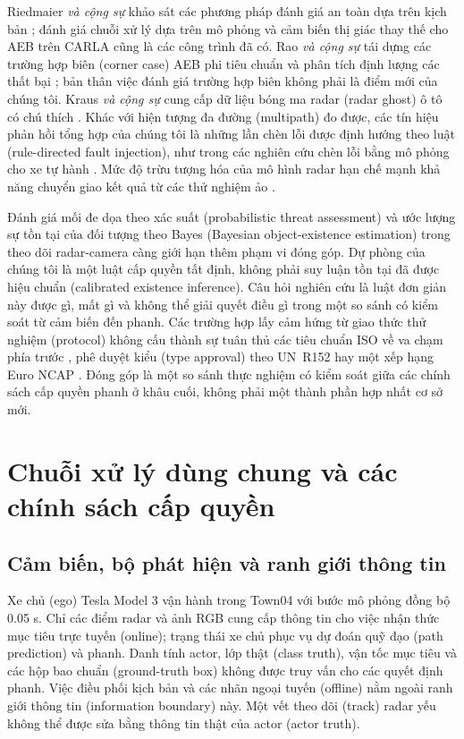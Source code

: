 \documentclass[11pt,a4paper]{article}
\begin{document}
Riedmaier \emph{và cộng sự} khảo sát các phương pháp đánh giá an toàn dựa trên
kịch bản \cite{riedmaier2020survey}; đánh giá chuỗi xử lý dựa trên mô phỏng
\cite{gomez2022carla} và cảm biến thị giác thay thế cho AEB trên CARLA
\cite{feng2025dvs} cũng là các công trình đã có. Rao \emph{và cộng sự} tái
dựng các trường hợp biên (corner case) AEB phi tiêu chuẩn và phân tích định
lượng các thất bại \cite{rao2024corner}; bản thân việc đánh giá trường hợp
biên không phải là điểm mới của chúng tôi. Kraus \emph{và cộng sự} cung cấp
dữ liệu bóng ma radar (radar ghost) ô tô có chú thích \cite{kraus2021ghost}.
Khác với hiện tượng đa đường (multipath) đo được, các tín hiệu phản hồi tổng
hợp của chúng tôi là những lần chèn lỗi được định hướng theo luật
(rule-directed fault injection), như trong các nghiên cứu chèn lỗi bằng mô
phỏng cho xe tự hành \cite{jha2019mlfi}. Mức độ trừu tượng hóa của mô hình
radar hạn chế mạnh khả năng chuyển giao kết quả từ các thử nghiệm ảo
\cite{magosi2022radar}.

Đánh giá mối đe dọa theo xác suất (probabilistic threat assessment)
\cite{sandblom2011threat} và ước lượng sự tồn tại của đối tượng theo Bayes
(Bayesian object-existence estimation) trong theo dõi radar-camera
\cite{lindenmaier2022existence} càng giới hạn thêm phạm vi đóng góp. Dự phòng
của chúng tôi là một luật cấp quyền tất định, không phải suy luận tồn tại đã
được hiệu chuẩn (calibrated existence inference). Câu hỏi nghiên cứu là luật
đơn giản này được gì, mất gì và không thể giải quyết điều gì trong một so sánh
có kiểm soát từ cảm biến đến phanh. Các trường hợp lấy cảm hứng từ giao thức
thử nghiệm (protocol) không cấu thành sự tuân thủ các tiêu chuẩn ISO về va
chạm phía trước \cite{iso15623,iso22839}, phê duyệt kiểu (type approval) theo
UN~R152 \cite{unr152} hay một xếp hạng Euro NCAP \cite{euroncap_aeb}. Đóng góp
là một so sánh thực nghiệm có kiểm soát giữa các chính sách cấp quyền phanh
ở khâu cuối, không phải một thành phần hợp nhất cơ sở mới.

\section{Chuỗi xử lý dùng chung và các chính sách cấp quyền}
\subsection{Cảm biến, bộ phát hiện và ranh giới thông tin}
Xe chủ (ego) Tesla Model 3 vận hành trong Town04 với bước mô phỏng đồng bộ
0.05 s. Chỉ các điểm radar và ảnh RGB cung cấp thông tin cho việc nhận thức
mục tiêu trực tuyến (online); trạng thái xe chủ phục vụ dự đoán quỹ đạo (path
prediction) và phanh. Danh tính actor, lớp thật (class truth), vận tốc mục
tiêu và các hộp bao chuẩn (ground-truth box) không được truy vấn cho các quyết
định phanh. Việc điều phối kịch bản và các nhãn ngoại tuyến (offline) nằm
ngoài ranh giới thông tin (information boundary) này. Một vết theo dõi (track)
radar yếu không thể được sửa bằng thông tin thật của actor (actor truth).
\end{document}

